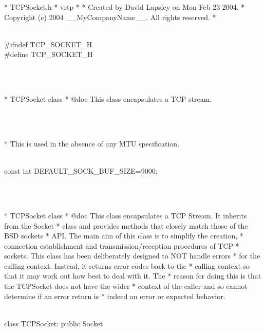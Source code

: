 \documentclass{article}
\begin{document}
 *  TCPSocket.h
 *  vrtp
 *
 *  Created by David Lapsley on Mon Feb 23 2004.
 *  Copyright (c) 2004 __MyCompanyName__. All rights reserved.
 *
 \strut\goodbreak
{}\strut\nopagebreak\\
 #ifndef TCP_SOCKET_H
\\
 #define TCP_SOCKET_H
\strut\\\strut\\* TCPSocket class
  * @doc This class encapsulates a TCP stream.
  \strut\\\strut\\* This is used in the absence of any MTU specification. \strut\goodbreak
{}\strut\nopagebreak\\
 const int DEFAULT_SOCK_BUF_SIZE=9000;
\strut\\\strut\\* TCPSocket class
  * @doc This class encapsulates a TCP Stream. It inherits from the Socket
  * class and provides methods that closely match those of the BSD sockets
  * API. The main aim of this class is to simplify the creation, 
  * connection establishment and transmission/reception procedures of TCP 
  * sockets. This class has been deliberately designed to NOT handle errors 
  * for the calling context. Instead, it returns error codes back to the 
  * calling context so that it may work out how best to deal with it. The 
  * reason for doing this is that the TCPSocket does not have the wider 
  * context of the caller and so cannot determine if an error return is 
  * indeed an error or expected behavior.
  \strut\goodbreak
{}\strut\nopagebreak\\
 class TCPSocket: public Socket 
\\
\end{document}
